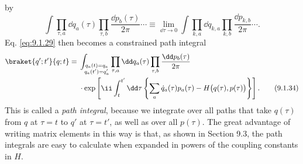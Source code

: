 by
\begin{equation}
  \int\prod_{\tau,a}\dd q_a(\tau)\prod_{\tau,b}\frac{\dd p_b(\tau)}{2\pi}\cdots
  \equiv\lim_{\dd\tau\to0}\int\prod_{k,a}\dd q_{k,a}
  \prod_{k,b}\frac{\dd p_{k,b}}{2\pi}\cdots.
  \tag{9.1.33}\label{eq:9.1.33}
\end{equation}
Eq. \eqref{eq:9.1.29} then becomes a constrained path integral
\begin{align}
  \braket{q';t'}{q;t}
  ={}&\int_{\substack{q_a(t)=q_a\\q_a(t')=q'_a}}
  \prod_{\tau,a}\dd q_a(\tau)\prod_{\tau,b}\frac{\dd p_b(\tau)}{2\pi}
  \notag\\
  &\cdot\exp\left[\ii\int_t^{t'}\dd\tau
  \left\{\sum_a\dot q_a(\tau)p_a(\tau)
  -H\bigl(q(\tau),p(\tau)\bigr)\right\}\right].
  \tag{9.1.34}\label{eq:9.1.34}
\end{align}
This is called a \emph{path integral}, because we integrate over all paths
that take $q(\tau)$ from $q$ at $\tau=t$ to $q'$ at $\tau=t'$, as well as
over all $p(\tau)$. The great advantage of writing matrix elements in this
way is that, as shown in Section 9.3, the path integrals are easy to calculate
when expanded in powers of the coupling constants in $H$.

